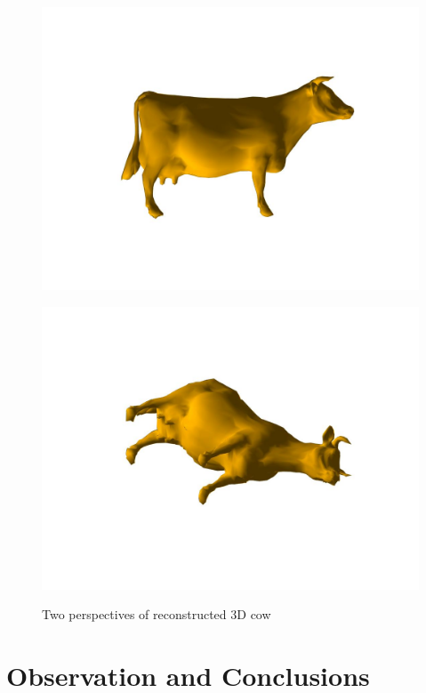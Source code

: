 \documentclass[letter,10pt]{article}
\begin{document}
\begin{figure}[H]
\centering
\begin{minipage}{0.495\linewidth}
\includegraphics[width=1\linewidth]{cow1.jpg}\\
\end{minipage}\hfill
\begin{minipage}{0.495\linewidth}
\includegraphics[width=1\linewidth]{cow2.jpg}\\
\end{minipage}\hfill
\caption{Two perspectives of reconstructed 3D cow}
\end{figure}


\section{Observation and Conclusions}
\end{document}
